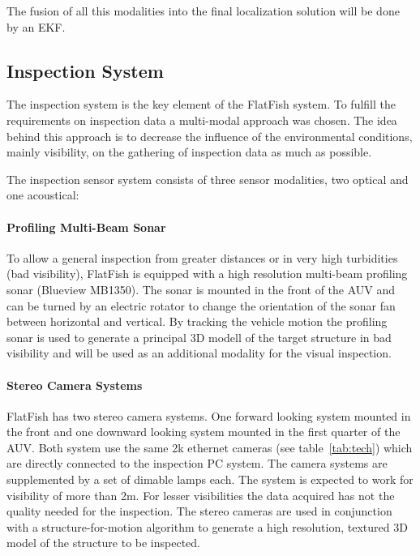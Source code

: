 \documentclass[conference]{IEEEtran}
\begin{document}
The fusion of all this modalities into the final localization solution will be done by an EKF.

\subsection{Inspection System}
\label{sec:insp}

The inspection system is the key element of the FlatFish system. To fulfill the requirements 
on inspection data a multi-modal approach was chosen. The idea behind this approach is 
to decrease the influence of the environmental conditions, mainly visibility, on the gathering 
of inspection data as much as possible.

The inspection sensor system consists of three sensor modalities, two optical and one 
acoustical:
\paragraph*{\textbf{Profiling Multi-Beam Sonar}} To allow a general inspection from greater 
distances or in very high turbidities (bad visibility), FlatFish is equipped with a high resolution 
multi-beam profiling sonar (Blueview MB1350). The sonar is mounted in the front of the AUV 
and can be turned by an electric rotator to change the orientation of the sonar fan between 
horizontal and vertical. By tracking the vehicle motion the profiling sonar is used to generate 
a principal 3D modell of the target structure in bad visibility and will be used as an 
additional modality for the visual inspection.

\paragraph*{\textbf{Stereo Camera Systems}} FlatFish has two stereo camera systems. 
One forward looking system mounted in the front and one downward looking system 
mounted in the first quarter of the AUV. Both system use the same 2k ethernet cameras 
(see table~\ref{tab:tech}) which are directly connected to the inspection PC system. The 
camera systems are supplemented by a set of dimable lamps each. The system is expected 
to work for visibility of more than 2m. For lesser visibilities the data acquired has not the 
quality needed for the inspection. The stereo cameras are used in conjunction with a 
structure-for-motion algorithm to generate a high resolution, textured 3D model of the 
structure to be inspected.
\end{document}

